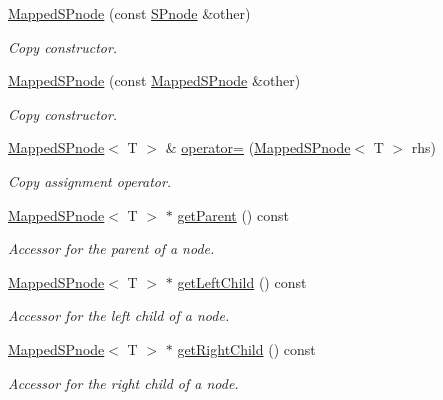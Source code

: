 \begin{DoxyCompactItemize}
\hyperlink{classsubpavings_1_1MappedSPnode_a528b15231c2a8476fdeb9283137dc9b1}{\-Mapped\-S\-Pnode} (const \hyperlink{classsubpavings_1_1SPnode}{\-S\-Pnode} \&other)
\begin{DoxyCompactList}\small\item\em \-Copy constructor. \end{DoxyCompactList}\item 
\hyperlink{classsubpavings_1_1MappedSPnode_a3e0ee96e161385b67f5ccc39b4212bdf}{\-Mapped\-S\-Pnode} (const \hyperlink{classsubpavings_1_1MappedSPnode}{\-Mapped\-S\-Pnode} \&other)
\begin{DoxyCompactList}\small\item\em \-Copy constructor. \end{DoxyCompactList}\item 
\hyperlink{classsubpavings_1_1MappedSPnode}{\-Mapped\-S\-Pnode}$<$ \-T $>$ \& \hyperlink{classsubpavings_1_1MappedSPnode_a9f159be71fab10b26dec5d080fec95ff}{operator=} (\hyperlink{classsubpavings_1_1MappedSPnode}{\-Mapped\-S\-Pnode}$<$ \-T $>$ rhs)
\begin{DoxyCompactList}\small\item\em \-Copy assignment operator. \end{DoxyCompactList}\item 
\hyperlink{classsubpavings_1_1MappedSPnode}{\-Mapped\-S\-Pnode}$<$ \-T $>$ $\ast$ \hyperlink{classsubpavings_1_1MappedSPnode_a700d3bf53c72e2fdecf27446fab902ef}{get\-Parent} () const 
\begin{DoxyCompactList}\small\item\em \-Accessor for the parent of a node. \end{DoxyCompactList}\item 
\hyperlink{classsubpavings_1_1MappedSPnode}{\-Mapped\-S\-Pnode}$<$ \-T $>$ $\ast$ \hyperlink{classsubpavings_1_1MappedSPnode_a31cc4a453d0c821592096b1829e43093}{get\-Left\-Child} () const 
\begin{DoxyCompactList}\small\item\em \-Accessor for the left child of a node. \end{DoxyCompactList}\item 
\hyperlink{classsubpavings_1_1MappedSPnode}{\-Mapped\-S\-Pnode}$<$ \-T $>$ $\ast$ \hyperlink{classsubpavings_1_1MappedSPnode_a3d15d4b64a8c01fbfabdb66c37c89ad9}{get\-Right\-Child} () const 
\begin{DoxyCompactList}\small\item\em \-Accessor for the right child of a node. \end{DoxyCompactList}\item 

\end{DoxyCompactItemize}
